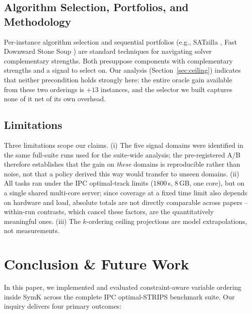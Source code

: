 \documentclass[twocolumn,10pt]{article}
\begin{document}
\subsection{Algorithm Selection, Portfolios, and Methodology}
Per-instance algorithm selection and sequential portfolios (e.g., \textsf{SATzilla} \cite{xu2008satzilla}, Fast Downward Stone Soup \cite{helmert2011stonesoup}) are standard techniques for navigating solver complementary strengths. Both presuppose components with complementary strengths and a signal to select on. Our analysis (Section~\ref{sec:ceiling}) indicates that neither precondition holds strongly here: the entire oracle gain available from these two orderings is $+13$ instances, and the selector we built captures none of it net of its own overhead.


\subsection{Limitations}\label{sec:limits}
Three limitations scope our claims. (i) The five signal domains were identified in the same full-suite runs used for the suite-wide analysis; the pre-registered A/B therefore establishes that the gain on \emph{these} domains is reproducible rather than noise, not that a policy derived this way would transfer to unseen domains. (ii) All tasks ran under the IPC optimal-track limits (1800\,s, 8\,GB, one core), but on a single shared multi-core server; since coverage at a fixed time limit also depends on hardware and load, absolute totals are not directly comparable across papers -- within-run contrasts, which cancel these factors, are the quantitatively meaningful ones. (iii) The $k$-ordering ceiling projections are model extrapolations, not measurements.

\section{Conclusion \& Future Work}
In this paper, we implemented and evaluated constraint-aware variable ordering inside \textsf{SymK} across the complete IPC optimal-STRIPS benchmark suite. Our inquiry delivers four primary outcomes:
\end{document}
